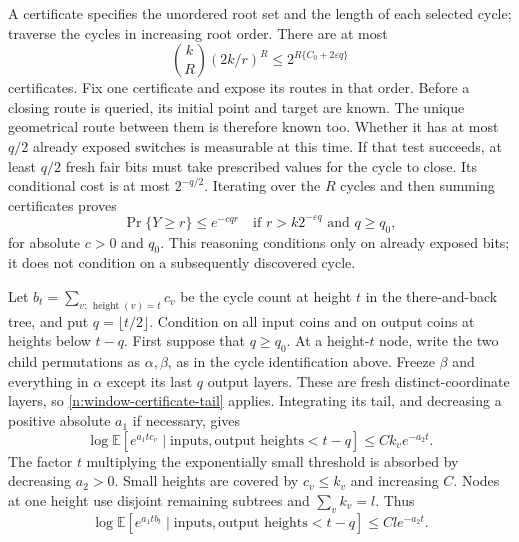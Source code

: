 A certificate specifies the unordered root set and the length of
each selected cycle; traverse the cycles in increasing root order.
There are at most
\[
 \binom kR(2k/r)^R
 \le2^{R\{C_0+2\varepsilon q\}}
\]
certificates.  Fix one certificate and expose its routes in that
order.  Before a closing route is queried, its initial point and
target are known.  The unique geometrical route between them is
therefore known too.  Whether it has at most $q/2$ already exposed
switches is measurable at this time.  If that test succeeds, at
least $q/2$ fresh fair bits must take prescribed values for the
cycle to close.  Its conditional cost is at most $2^{-q/2}$.
Iterating over the $R$ cycles and then summing certificates proves
\begin{equation}\label{n:window-certificate-tail}
 \Pr\{Y\ge r\}\le e^{-cqr}
 \quad\text{if }r>k2^{-\varepsilon q}
 \text{ and }q\ge q_0,
\end{equation}
for absolute $c>0$ and $q_0$.  This reasoning conditions only on
already exposed bits; it does not condition on a subsequently
discovered cycle.

Let $b_t=\sum_{v:\,\operatorname{height}(v)=t}c_v$ be the cycle
count at height $t$ in the there-and-back tree, and put
$q=\lfloor t/2\rfloor$.  Condition on all input coins and on output
coins at heights below $t-q$.  First suppose that $q\ge q_0$.
At a height-$t$ node, write the two child permutations as
$\alpha,\beta$, as in the cycle identification above.  Freeze
$\beta$ and everything in $\alpha$ except its last $q$ output
layers.  These are fresh distinct-coordinate layers,
so \eqref{n:window-certificate-tail} applies.  Integrating its tail,
and decreasing a positive absolute $a_1$ if necessary, gives
\[
 \log\mathbb E\left[e^{a_1t c_v}\mid
       \text{inputs},\text{output heights}<t-q\right]
       \le Ck_v e^{-a_2t}.
\]
The factor $t$ multiplying the exponentially small threshold is
absorbed by decreasing $a_2>0$.  Small heights are covered by
$c_v\le k_v$ and increasing $C$.  Nodes at one height use disjoint
remaining subtrees and $\sum_vk_v=l$.  Thus
\begin{equation}\label{n:coherent-window-mgf}
 \log\mathbb E\left[e^{a_1t b_t}\mid
       \text{inputs},\text{output heights}<t-q\right]
       \le Cl e^{-a_2t}.
\end{equation}

